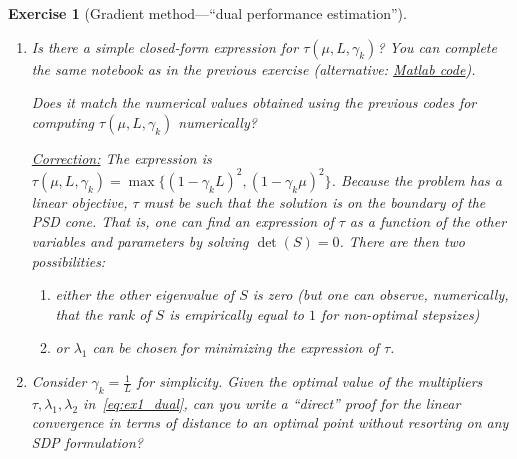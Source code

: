 \documentclass[11pt,a4paper]{article}
\newcommand{\correction}[1]{{{\color{blue}\underline{Correction:} #1}}}
\newcommand{\correction}[1]{}
\newtheorem{exercise}{Exercise}
\begin{document}
\begin{exercise}[Gradient method---``dual performance estimation'']
\begin{enumerate}
	For doing that, you can complete the following \href{https://github.com/PerformanceEstimation/Learning-Performance-Estimation/tree/main/Exercises - codes/Jupyter/Exercise2.ipynb}{Python code} (alternative: \href{https://github.com/PerformanceEstimation/Learning-Performance-Estimation/blob/main/Exercises - codes/Matlab/Exercise2.m}{Matlab code}).

	\item Is there a simple closed-form expression for $\tau(\mu,L,\gamma_k)$? You can complete the same notebook as in the previous exercise (alternative: \href{https://github.com/PerformanceEstimation/Learning-Performance-Estimation/blob/main/Exercises - codes/Matlab/Exercise2_closedform.m}{Matlab code}).
	
	Does it match the numerical values obtained using the previous codes for computing $\tau(\mu,L,\gamma_k)$ numerically?
	
	\correction{The expression is $\tau(\mu,L,\gamma_k)=\max\{(1-\gamma_k L)^2,(1-\gamma_k\mu)^2\}$. Because the problem has a linear objective, $\tau$ must be such that the solution is on the boundary of the PSD cone. That is, one can find an expression of $\tau$ as a function of the other variables and parameters by solving $\det(S)=0$. There are then two possibilities:
	\begin{enumerate}
	\item either the other eigenvalue of $S$ is zero (but one can observe, numerically, that the rank of $S$ is empirically equal to $1$ for non-optimal stepsizes)
	\item or $\lambda_1$ can be chosen for minimizing the expression of $\tau$.
	\end{enumerate}}
	
	\item Consider $\gamma_k=\frac{1}{L}$ for simplicity. Given the optimal value of the multipliers $\tau,\lambda_1,\lambda_2$ in~\eqref{eq:ex1_dual}, can you write a ``direct'' proof for the linear convergence in terms of distance to an optimal point without resorting on any SDP formulation?
	

\end{enumerate}
\end{exercise}
\end{document}
